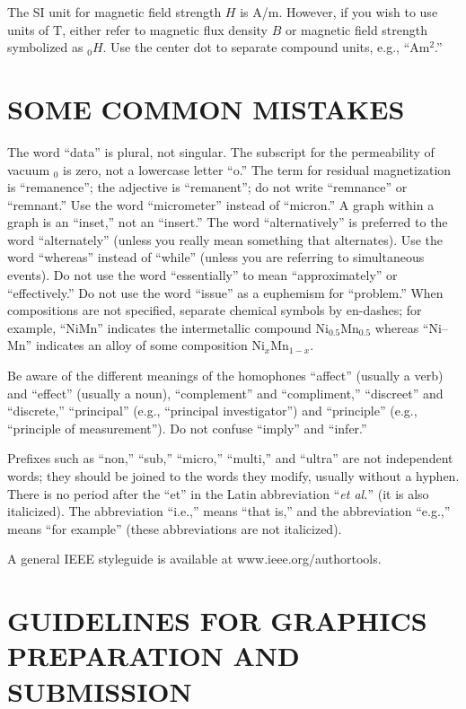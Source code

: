 \documentclass{ieeeojpel}
\begin{document}
The SI unit for magnetic field strength $H$ is A/m. However, if you wish to use 
units of T, either refer to magnetic flux density $B$ or magnetic field 
strength symbolized as \textmu $_{0}H$. Use the center dot to separate 
compound units, e.g., ``A\textbullet m$^{2}$.''

\section{SOME COMMON MISTAKES}
The word ``data'' is plural, not singular. The subscript for the 
permeability of vacuum \textmu $_{0}$ is zero, not a lowercase letter ``o.'' 
The term for residual magnetization is ``remanence''; the adjective is 
``remanent''; do not write ``remnance'' or ``remnant.'' Use the word 
``micrometer'' instead of ``micron.'' A graph within a graph is an 
``inset,'' not an ``insert.'' The word ``alternatively'' is preferred to the 
word ``alternately'' (unless you really mean something that alternates). Use 
the word ``whereas'' instead of ``while'' (unless you are referring to 
simultaneous events). Do not use the word ``essentially'' to mean 
``approximately'' or ``effectively.'' Do not use the word ``issue'' as a 
euphemism for ``problem.'' When compositions are not specified, separate 
chemical symbols by en-dashes; for example, ``NiMn'' indicates the 
intermetallic compound Ni$_{0.5}$Mn$_{0.5}$ whereas ``Ni--Mn'' indicates an 
alloy of some composition Ni$_{x}$Mn$_{1-x}$.

Be aware of the different meanings of the homophones ``affect'' (usually a 
verb) and ``effect'' (usually a noun), ``complement'' and ``compliment,'' 
``discreet'' and ``discrete,'' 
``principal'' (e.g., ``principal investigator'') and ``principle'' 
(e.g., ``principle of measurement''). Do not confuse ``imply'' and 
``infer.'' 

Prefixes such as ``non,'' ``sub,'' ``micro,'' ``multi,'' and ``ultra'' are 
not independent words; they should be joined to the words they modify, 
usually without a hyphen. There is no period after the ``et'' in the Latin 
abbreviation ``\textit{et al.}'' (it is also italicized). The abbreviation ``i.e.,'' means 
``that is,'' and the abbreviation ``e.g.,'' means ``for example'' (these 
abbreviations are not italicized).

A general IEEE styleguide is available at www.ieee.org/\break authortools.

\section{GUIDELINES FOR GRAPHICS PREPARATION 
AND SUBMISSION}
\end{document}
